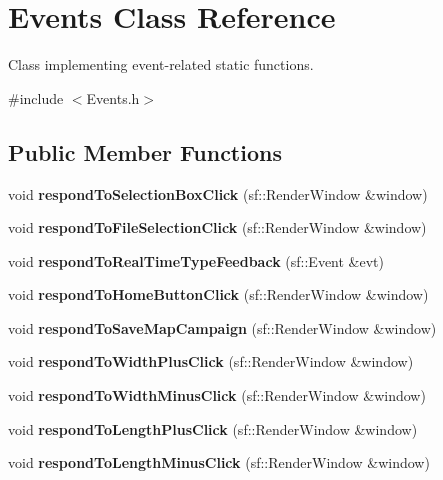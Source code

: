\hypertarget{classEvents}{}\section{Events Class Reference}
\label{classEvents}


Class implementing event-\/related static functions.  




{\ttfamily \#include $<$Events.\+h$>$}

\subsection*{Public Member Functions}
\begin{DoxyCompactItemize}
\item 
\hypertarget{classEvents_a08a2b8733b41c9356be8b5c60a993002}{}\label{classEvents_a08a2b8733b41c9356be8b5c60a993002} 
void {\bfseries respond\+To\+Selection\+Box\+Click} (sf\+::\+Render\+Window \&window)
\item 
\hypertarget{classEvents_aa962b711f3dd2819ebbbd2a2372f3778}{}\label{classEvents_aa962b711f3dd2819ebbbd2a2372f3778} 
void {\bfseries respond\+To\+File\+Selection\+Click} (sf\+::\+Render\+Window \&window)
\item 
\hypertarget{classEvents_a0bdec91904043a57c7ef054af84944ad}{}\label{classEvents_a0bdec91904043a57c7ef054af84944ad} 
void {\bfseries respond\+To\+Real\+Time\+Type\+Feedback} (sf\+::\+Event \&evt)
\item 
\hypertarget{classEvents_abc34090de5d18d693e3b3652f67f9042}{}\label{classEvents_abc34090de5d18d693e3b3652f67f9042} 
void {\bfseries respond\+To\+Home\+Button\+Click} (sf\+::\+Render\+Window \&window)
\item 
\hypertarget{classEvents_a93b7a5a72bc4664c7056a01baaba4f0a}{}\label{classEvents_a93b7a5a72bc4664c7056a01baaba4f0a} 
void {\bfseries respond\+To\+Save\+Map\+Campaign} (sf\+::\+Render\+Window \&window)
\item 
\hypertarget{classEvents_a2a16880ea41390d4e09cb6b2f6004443}{}\label{classEvents_a2a16880ea41390d4e09cb6b2f6004443} 
void {\bfseries respond\+To\+Width\+Plus\+Click} (sf\+::\+Render\+Window \&window)
\item 
\hypertarget{classEvents_a178edd35db22687a99cf0d6ade67d2c1}{}\label{classEvents_a178edd35db22687a99cf0d6ade67d2c1} 
void {\bfseries respond\+To\+Width\+Minus\+Click} (sf\+::\+Render\+Window \&window)
\item 
\hypertarget{classEvents_a8c8fea4c335c6dfe92b113d6ec833cca}{}\label{classEvents_a8c8fea4c335c6dfe92b113d6ec833cca} 
void {\bfseries respond\+To\+Length\+Plus\+Click} (sf\+::\+Render\+Window \&window)
\item 
\hypertarget{classEvents_a465be1e7e3a53de88d5febe21c15a625}{}\label{classEvents_a465be1e7e3a53de88d5febe21c15a625} 
void {\bfseries respond\+To\+Length\+Minus\+Click} (sf\+::\+Render\+Window \&window)
\end{DoxyCompactItemize}


